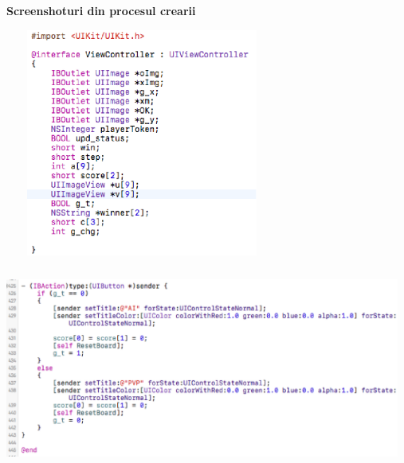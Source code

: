 \tab \textbf{Screenshoturi din procesul crearii}
\begin{center} 
\includegraphics[width=9cm, height=7.5cm]{2.eps}
\end{center}
\begin{center} 
\includegraphics[width=13cm, height=6.5cm]{3.eps}
\end{center}

\clearpage
